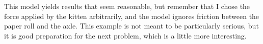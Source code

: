 \documentclass[12pt]{book}
\theoremstyle{exercise}
\newcommand\blankpage{%
    \null
    \thispagestyle{empty}%
    \addtocounter{page}{-1}%
    \newpage}
\begin{document}
This model yields results that seem reasonable, but remember that I chose the force applied by the kitten arbitrarily, and the model ignores friction between the paper roll and the axle.  This example is not meant to be particularly serious, but it is good preparation for the next problem, which is a little more interesting.












\backmatter
\printindex

\afterpage{\blankpage}
\end{document}
